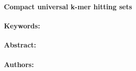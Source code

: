 \noindent
\large {\bf Compact universal k-mer hitting sets} 


\normalsize 


\noindent \paragraph{Keywords:} 

\noindent \paragraph{Abstract:} 



\noindent \paragraph{Authors:} 

